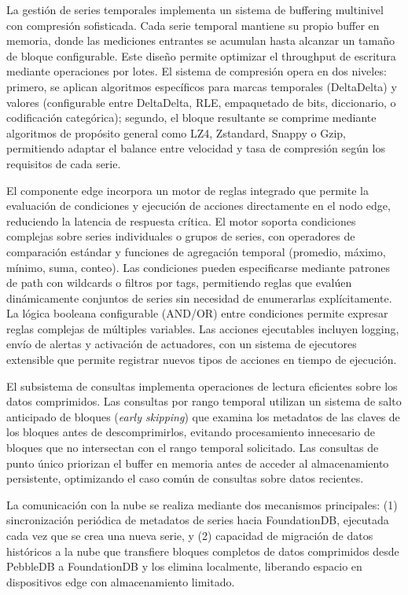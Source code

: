 La gestión de series temporales implementa un sistema de buffering multinivel con compresión sofisticada. Cada serie temporal mantiene su propio buffer en memoria, donde las mediciones entrantes se acumulan hasta alcanzar un tamaño de bloque configurable. Este diseño permite optimizar el throughput de escritura mediante operaciones por lotes. El sistema de compresión opera en dos niveles: primero, se aplican algoritmos específicos para marcas temporales (DeltaDelta) y valores (configurable entre DeltaDelta, RLE, empaquetado de bits, diccionario, o codificación categórica); segundo, el bloque resultante se comprime mediante algoritmos de propósito general como LZ4, Zstandard, Snappy o Gzip, permitiendo adaptar el balance entre velocidad y tasa de compresión según los requisitos de cada serie.

El componente edge incorpora un motor de reglas integrado que permite la evaluación de condiciones y ejecución de acciones directamente en el nodo edge, reduciendo la latencia de respuesta crítica. El motor soporta condiciones complejas sobre series individuales o grupos de series, con operadores de comparación estándar y funciones de agregación temporal (promedio, máximo, mínimo, suma, conteo). Las condiciones pueden especificarse mediante patrones de path con wildcards o filtros por tags, permitiendo reglas que evalúen dinámicamente conjuntos de series sin necesidad de enumerarlas explícitamente. La lógica booleana configurable (AND/OR) entre condiciones permite expresar reglas complejas de múltiples variables. Las acciones ejecutables incluyen logging, envío de alertas y activación de actuadores, con un sistema de ejecutores extensible que permite registrar nuevos tipos de acciones en tiempo de ejecución.

El subsistema de consultas implementa operaciones de lectura eficientes sobre los datos comprimidos. Las consultas por rango temporal utilizan un sistema de salto anticipado de bloques (\textit{early skipping}) que examina los metadatos de las claves de los bloques antes de descomprimirlos, evitando procesamiento innecesario de bloques que no intersectan con el rango temporal solicitado. Las consultas de punto único priorizan el buffer en memoria antes de acceder al almacenamiento persistente, optimizando el caso común de consultas sobre datos recientes.

La comunicación con la nube se realiza mediante dos mecanismos principales: (1) sincronización periódica de metadatos de series hacia FoundationDB, ejecutada cada vez que se crea una nueva serie, y (2) capacidad de migración de datos históricos a la nube que transfiere bloques completos de datos comprimidos desde PebbleDB a FoundationDB y los elimina localmente, liberando espacio en dispositivos edge con almacenamiento limitado.

